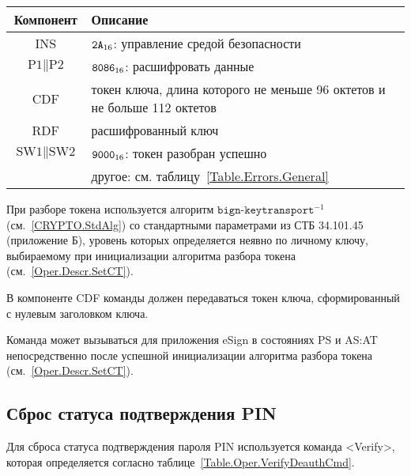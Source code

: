 \begin{table}[hbt]
\caption{}\label{Table.Oper.DecipherCmd}
\begin{tabular}{|c|p{14cm}|}
\hline
Компонент & Описание\\ 
\hline
\hline
INS & $\texttt{2A}_{16}$: управление средой безопасности \\
\hline
$\text{P1} \parallel \text{P2}$ & $\texttt{8086}_{16}$: расшифровать
данные \\ 
\hline
CDF & токен ключа, длина которого не
меньше 96 октетов и не больше 112 октетов\\
\hline 
RDF &  расшифрованный ключ \\
\hline
$\text{SW1} \parallel \text{SW2}$ & $\texttt{9000}_{16}$: 
токен разобран успешно\\
& другое: см. таблицу~\ref{Table.Errors.General} \\
\hline
\end{tabular}
\end{table}

При разборе токена используется алгоритм $\texttt{bign-keytransport}^{-1}$
(см.~\ref{CRYPTO.StdAlg})
со стандартными параметрами из СТБ 34.101.45 (приложение Б), 
уровень которых определяется неявно по личному ключу,
выбираемому при инициализации алгоритма разбора токена 
(см.~\ref{Oper.Descr.SetCT}). 

В компоненте CDF команды должен передаваться токен ключа, 
сформированный с нулевым заголовком ключа. 

Команда может вызываться для приложения eSign в состояниях 
PS и AS:AT непосредственно после успешной инициализации 
алгоритма разбора токена (см.~\ref{Oper.Descr.SetCT}).






\subsection{Сброс статуса подтверждения PIN}
\label{Oper.Descr.VerifyDeauth}

Для сброса статуса подтверждения пароля PIN
используется команда <Verify>,
которая определяется согласно 
таблице~\ref{Table.Oper.VerifyDeauthCmd}.

